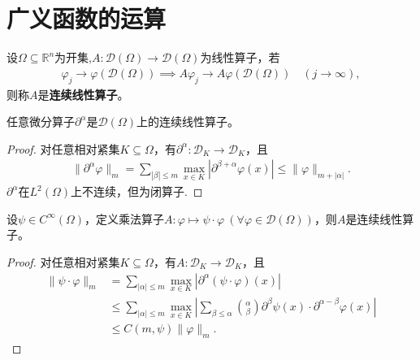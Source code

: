 \documentclass[../../main.tex]{subfiles}%
\begin{document}
\section{广义函数的运算}

\begin{definition}
设$\Omega\subseteq\mathbb{R}^n$为开集,$A:\mathscr{D}(\Omega)\to\mathscr{D}(\Omega)$为线性算子，若
\begin{align*}
\varphi_j\to\varphi(\mathscr{D}(\Omega))\implies A\varphi_j\to A\varphi(\mathscr{D}(\Omega))\quad(j\to\infty),
\end{align*}
则称$A$是\textbf{连续线性算子}。
\end{definition}

\begin{example}
任意微分算子$\partial^\alpha$是$\mathscr{D}(\Omega)$上的连续线性算子。
\end{example}
\begin{proof}

对任意相对紧集$K\subseteq\Omega$，有$\partial^\alpha:\mathscr{D}_K\to\mathscr{D}_K$，且
\begin{align*}
\|\partial^\alpha\varphi\|_m=\sum\limits_{|\beta|\leqslant m}\max\limits_{x\in K}|\partial^{\beta+\alpha}\varphi(x)|\leqslant\|\varphi\|_{m+|\alpha|}.
\end{align*}
$\partial^\alpha$在$L^2(\Omega)$上不连续，但为闭算子.

\end{proof}

\begin{example}
设$\psi\in C^\infty(\Omega)$，定义乘法算子$A:\varphi\mapsto\psi\cdot\varphi\ (\forall\varphi\in\mathscr{D}(\Omega))$，则$A$是连续线性算子。
\end{example}
\begin{proof}

对任意相对紧集$K\subseteq\Omega$，有$A:\mathscr{D}_K\to\mathscr{D}_K$，且
\begin{align*}
\|\psi\cdot\varphi\|_m&=\sum\limits_{|\alpha|\leqslant m}\max\limits_{x\in K}|\partial^\alpha(\psi\cdot\varphi)(x)|\\
&\leqslant\sum\limits_{|\alpha|\leqslant m}\max\limits_{x\in K}\left|\sum\limits_{\beta\leqslant\alpha}\binom{\alpha}{\beta}\partial^\beta\psi(x)\cdot\partial^{\alpha-\beta}\varphi(x)\right|\\
&\leqslant C(m,\psi)\|\varphi\|_m.
\end{align*}

\end{proof}
\end{document}
